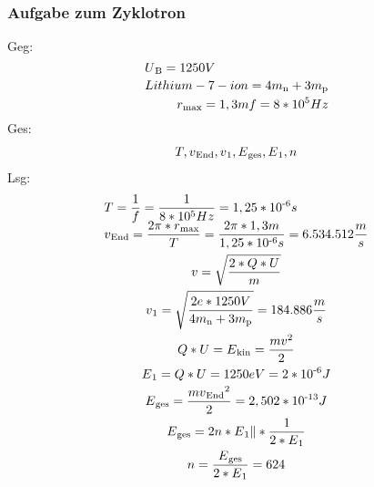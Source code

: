 \documentclass{scrartcl}
\begin{document}
        \subsubsection*{Aufgabe zum Zyklotron}
        Geg:
        \begin{equation}
            \begin{multlined}
                U\textsubscript{B} = 1250V \\
                Lithium-7-ion=4m\textsubscript{n}+3m\textsubscript{p} \\
                r\textsubscript{$\max$} = 1,3m
                f=8*10^5 Hz
            \end{multlined}
        \end{equation}
        Ges:
        \begin{equation}
            \begin{multlined}
                T,
                v\textsubscript{End},
                v\textsubscript{1},
                E\textsubscript{ges},
                E\textsubscript{1},
                n
            \end{multlined}
        \end{equation}
        Lsg:
        \begin{equation}
            \begin{multlined}
                T = \frac{1}{f} = \frac{1}{8*10^5 Hz} = 1,25 * 10\textsuperscript{-6}s \\
                v\textsubscript{End} = \frac{2\pi*r\textsubscript{$\max$}}{T} = \frac{2\pi*1,3m}{1,25 * 10\textsuperscript{-6}s} = 6.534.512 \frac{m}{s} \\
                v=\sqrt{\frac{2*Q*U}{m}} \\
                v\textsubscript{1}=\sqrt{\frac{2e*1250V}{4m\textsubscript{n}+3m\textsubscript{p}}} = 184.886 \frac{m}{s} \\
                Q*U=E\textsubscript{kin}=\frac{mv^2}{2} \\
                E\textsubscript{1}= Q*U = 1250 eV = 2*10\textsuperscript{-6} J \\
                E\textsubscript{ges} =\frac{mv\textsubscript{End}^2}{2} = 2,502*10\textsuperscript{-13}J \\
                E\textsubscript{ges} = 2n* E\textsubscript{1} \|*\frac{1}{2*E\textsubscript{1}} \\
                n=\frac{E\textsubscript{ges}}{2*E\textsubscript{1}}=624 \\
            \end{multlined}
        \end{equation}
\end{document}
